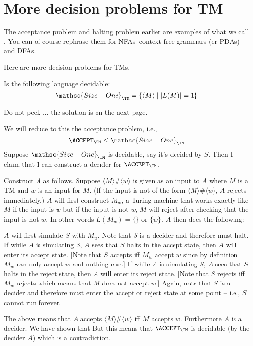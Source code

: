\section{More decision problems for TM}

The acceptance problem and halting problem earlier are examples
of what we call .
You can of course rephrase them for NFAs,
context-free grammars (or PDAs)
and DFAs.

Here are more decision problems for TMs.

\newpage
\newcommand\SIZEONE{\mathsc{Size-One}}
\begin{ex}
Is the following language decidable:
\[
\SIZEONE_\TM = \{ \langle M \rangle \mid |L(M)| = 1 \}
\]
\end{ex}

Do not peek ... the solution is on the next page.


\newpage
\SOLUTION

We will reduce to this the acceptance problem, i.e.,
\[
\ACCEPT_\TM \leq \SIZEONE_\TM
\]
Suppose $\SIZEONE_\TM$ is decidable, say it's decided by $S$.
Then I claim that I can construct a decider for $\ACCEPT_\TM$.

Construct $A$ as follows.
Suppose $\langle M \rangle \# \langle w \rangle$ is given
as an input to $A$ where
$M$ is a TM and $w$ is an input for $M$.
(If the input is not of the form $\langle M \rangle \# \langle w \rangle$,
$A$ rejects immediately.)
$A$ will first construct $M_w$, a Turing machine
that works exactly like $M$ if the input is $w$
but if the input is not $w$, $M$ will reject after checking that the
input is not $w$.
In other words $L(M_w) = \{\}$ or $\{w\}$.
$A$ then does the following:
\begin{tightlist}
  \li $A$ will first simulate
  $S$ with $M_w$.
  Note that $S$ is a decider and therefore must halt.
  \li If while $A$ is simulating
  $S$, $A$ sees that $S$ halts in the accept state, then
  $A$ will enter its accept state.
  [Note that $S$ accepts iff $M_w$
  accept $w$ since by definition $M_w$ can only accept $w$
  and nothing else.]
  \li
  If while $A$ is simulating $S$, $A$ sees that $S$
  halts in the reject state, then $A$ will enter its reject state.
  [Note that $S$ rejects iff $M_w$ rejects
  which means that $M$ does not accept $w$.]
  \li Again, note that $S$ is a decider and therefore must enter
  the accept or reject state at some point -- i.e., $S$
  cannot run forever.
\end{tightlist}
The above means that $A$ accepts $\langle M \rangle \# \langle w \rangle$
iff $M$ accepts $w$. Furthermore $A$ is a decider.
We have shown that
But this means that $\ACCEPT_\TM$ is decidable (by the decider $A$)
which is a contradiction.



